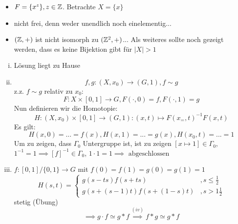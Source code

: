 \documentclass{scrartcl}
\begin{document}
\begin{aufgabe}
\begin{itemize}
\item $F=\{x^z\}, z \in \mathbb{Z}$. Betrachte $X=\{x\}$
\item nicht frei, denn weder unendlich noch einelementig...
\item $(\mathbb{Z}, +)$ ist nicht isomorph zu $(\mathbb{Z}^2, +)$... Als weiteres sollte noch gezeigt werden, dass es keine Bijektion gibt für $|X|>1$
\end{itemize} 
\end{aufgabe}

\begin{aufgabe}
\begin{enumerate}[(i)]
\item
Lösung liegt zu Hause
\item
\[
 f,g: (X,x_0) \to (G,1), f\sim g
\]
z.z. $f\sim g$ relativ zu $x_0$:\\
\[
 F:X\times[0,1] \to G, F(\cdot, 0)=f, F(\cdot, 1)=g
\]
Nun definieren wir die Homotopie:
\[
 H: (X,x_0)\times [0,1] \to (G,1): (x,t) \mapsto F(x_=,t)^{-1}F(x,t)
\]
Es gilt:
\[
 H(x,0)=...=f(x), H(x,1)=...=g(x), H(x_0, t)=...=1
\]
Um zu zeigen, dass $\Gamma_0$ Untergruppe ist, ist zu zeigen $[x\mapsto 1]\in \Gamma_0$, $1^{-1}=1 \implies [f]^{-1} \in \Gamma_0$, $1\cdot 1=1 \implies \text{ abgeschlossen}$
\item $f: [0,1]/\{0,1\} \to G$ mit $f(0)=f(1)=g(0)=g(1)=1$
\[
 H(s,t)=\begin{cases} g(s-ts) f(s+ts) &, s \le \frac{1}{2} \\ g(s+(s-1)t) f(s+(1-s)t) &, s>1\frac{1}{2} \end{cases}
\]
stetig (Übung)
\[
 \implies g \cdot f \simeq g*f \stackrel{(iv)}{\implies} f*g \simeq g*f
\]

\end{enumerate}
\end{aufgabe}
\end{document}
